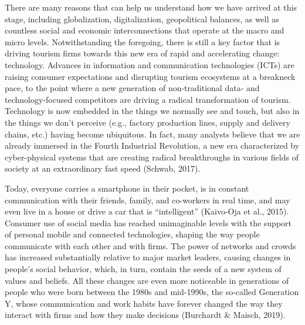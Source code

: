 \documentclass[
  letterpaper,
  DIV=11,
  numbers=noendperiod]{scrreprt}
\begin{document}
There are many reasons that can help us understand how we have arrived
at this stage, including globalization, digitalization, geopolitical
balances, as well as countless social and economic interconnections that
operate at the macro and micro levels. Notwithstanding the foregoing,
there is still a key factor that is driving tourism firms towards this
new era of rapid and accelerating change: technology. Advances in
information and communication technologies (ICTs) are raising consumer
expectations and disrupting tourism ecosystems at a breakneck pace, to
the point where a new generation of non-traditional data- and
technology-focused competitors are driving a radical transformation of
tourism. Technology is now embedded in the things we normally see and
touch, but also in the things we don't perceive (e.g., factory
production lines, supply and delivery chains, etc.) having become
ubiquitous. In fact, many analysts believe that we are already immersed
in the Fourth Industrial Revolution, a new era characterized by
cyber-physical systems that are creating radical breakthroughs in
various fields of society at an extraordinary fast speed (Schwab, 2017).

Today, everyone carries a smartphone in their pocket, is in constant
communication with their friends, family, and co-workers in real time,
and may even live in a house or drive a car that is ``intelligent''
(Kaivo-Oja et al., 2015). Consumer use of social media has reached
unimaginable levels with the support of personal mobile and connected
technologies, shaping the way people communicate with each other and
with firms. The power of networks and crowds has increased substantially
relative to major market leaders, causing changes in people's social
behavior, which, in turn, contain the seeds of a new system of values
and beliefs. All these changes are even more noticeable in generations
of people who were born between the 1980s and mid-1990s, the so-called
Generation Y, whose communication and work habits have forever changed
the way they interact with firms and how they make decisions (Burchardt
\& Maisch, 2019).
\end{document}
